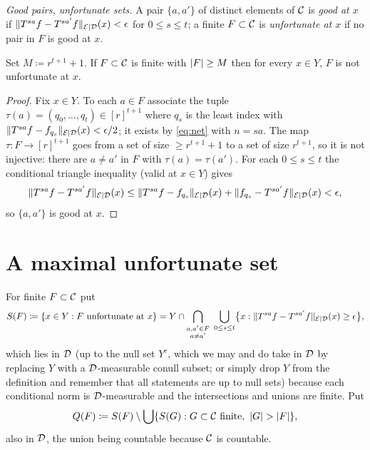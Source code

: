 \emph{Good pairs, unfortunate sets.}  A pair $\{a,a'\}$ of distinct elements of $\mathcal{C}$ is
\emph{good at $x$} if $\lVert T^{sa}f - T^{sa'}f \rVert_{\mathcal{E} \mid \mathcal{D}}(x) < \epsilon$ for $0 \leq s \leq t$; a finite
$F \subset \mathcal{C}$ is \emph{unfortunate at $x$} if no pair in $F$ is good at $x$.

\begin{lemma}[Pigeonhole]
  \label{lem:unfortunate}
  \leanok
  Set $M \coloneqq r^{t+1}+1$.  If $F \subset \mathcal{C}$ is finite with $\lvert F \rvert \geq M$ then for
  every $x \in Y$, $F$ is not unfortunate at $x$.
\end{lemma}

\begin{proof}
  Fix $x \in Y$.  To each $a \in F$ associate the tuple
  $\tau(a) = (q_0,\dots,q_t) \in [r]^{t+1}$ where $q_s$ is the least index with
  $\lVert T^{sa}f - f_{q_s} \rVert_{\mathcal{E} \mid \mathcal{D}}(x) < \epsilon/2$; it exists by \eqref{eq:net} with $n = sa$.  The
  map $\tau : F \to [r]^{t+1}$ goes from a set of size $\geq r^{t+1}+1$ to a set of size
  $r^{t+1}$, so it is not injective: there are $a \neq a'$ in $F$ with $\tau(a) = \tau(a')$.
  For each $0 \leq s \leq t$ the conditional triangle inequality (valid at $x \in Y$) gives
  \[
    \lVert T^{sa}f - T^{sa'}f \rVert_{\mathcal{E} \mid \mathcal{D}}(x) \leq \lVert T^{sa}f - f_{q_s} \rVert_{\mathcal{E} \mid \mathcal{D}}(x) + \lVert f_{q_s} - T^{sa'}f \rVert_{\mathcal{E} \mid \mathcal{D}}(x) < \epsilon ,
  \]
  so $\{a,a'\}$ is good at $x$.
\end{proof}

\section{A maximal unfortunate set}

For finite $F \subset \mathcal{C}$ put
\[
  S(F) \coloneqq \{x \in Y : F \text{ unfortunate at } x\}
  = Y \cap \bigcap_{\substack{a,a' \in F\\ a \neq a'}} \ \bigcup_{0 \leq s \leq t}
    \bigl\{ x : \lVert T^{sa}f - T^{sa'}f \rVert_{\mathcal{E} \mid \mathcal{D}}(x) \geq \epsilon \bigr\} ,
\]
which lies in $\mathcal{D}$ (up to the null set $Y^c$, which we may and do take in $\mathcal{D}$ by replacing
$Y$ with a $\mathcal{D}$-measurable conull subset; or simply drop $Y$ from the definition and remember
that all statements are up to null sets) because each conditional norm is $\mathcal{D}$-measurable and
the intersections and unions are finite.  Put
\[
  Q(F) \coloneqq S(F) \setminus \bigcup \{ S(G) : G \subset \mathcal{C} \text{ finite},\ \lvert G \rvert > \lvert F \rvert \} ,
\]
also in $\mathcal{D}$, the union being countable because $\mathcal{C}$ is countable.

